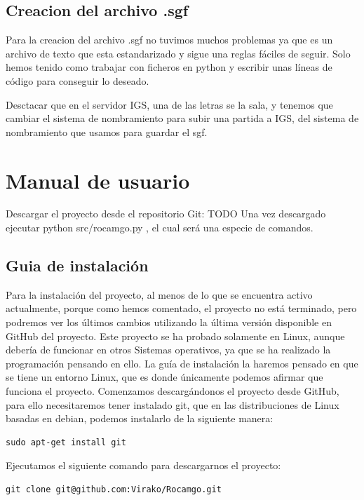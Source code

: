 \documentclass[12pt,a4paper]{report}
\begin{document}
\section{Creacion del archivo .sgf}

Para la creacion del archivo .sgf no tuvimos muchos problemas ya que es un
archivo de texto que esta estandarizado y sigue una reglas fáciles de seguir.
Solo hemos tenido como trabajar con ficheros en python y escribir unas líneas de
código para conseguir lo deseado.

Desctacar que en el servidor IGS, una de las letras se la sala, y tenemos que
cambiar el sistema de nombramiento para subir una partida a IGS, del sistema de
nombramiento que usamos para guardar el sgf. 



\chapter{Manual de usuario}

Descargar el proyecto desde el repositorio Git: TODO %
Una vez descargado ejecutar python src/rocamgo.py , el cual será una especie de
comandos.

\section{Guia de instalación} 

Para la instalación del proyecto, al menos de lo que se encuentra activo
actualmente, porque como hemos comentado, el proyecto no está terminado, pero
podremos ver los últimos cambios utilizando la última versión disponible en
GitHub del proyecto. Este proyecto se ha probado solamente en Linux, aunque
debería de funcionar en otros Sistemas operativos, ya que se ha realizado la
programación pensando en ello. 
La guía de instalación la haremos pensado en que se tiene un entorno Linux, que
es donde únicamente podemos afirmar que funciona el proyecto. Comenzamos
descargándonos el proyecto desde GitHub, para ello necesitaremos tener instalado
git, que en las distribuciones de Linux basadas en debian, podemos instalarlo de
la siguiente manera: 

\begin{verbatim}
sudo apt-get install git
\end{verbatim}

Ejecutamos el siguiente comando para descargarnos el proyecto: 

\begin{verbatim}
git clone git@github.com:Virako/Rocamgo.git
\end{verbatim}
\end{document}
